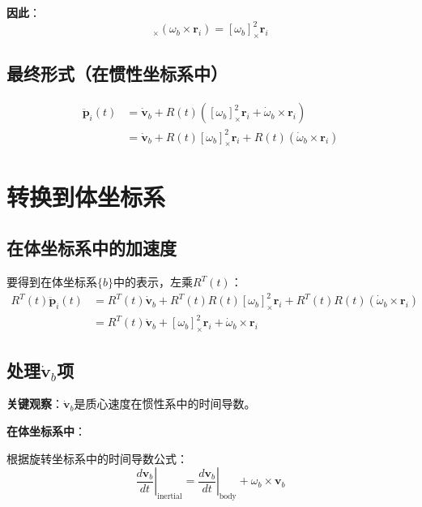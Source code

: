 \documentclass[12pt,a4paper]{article}
\begin{document}
\textbf{因此}：
\begin{equation}
[\omega_b]_{\times} (\omega_b \times \bm{r}_i) = [\omega_b]_{\times}^2 \bm{r}_i
\end{equation}

\subsection{最终形式（在惯性坐标系中）}

\begin{align}
\ddot{\bm{p}}_i(t) &= \dot{\bm{v}}_b + R(t) ([\omega_b]_{\times}^2 \bm{r}_i + \dot{\omega}_b \times \bm{r}_i) \\
&= \dot{\bm{v}}_b + R(t) [\omega_b]_{\times}^2 \bm{r}_i + R(t) (\dot{\omega}_b \times \bm{r}_i)
\label{eq:acceleration_inertial}
\end{align}

\section{转换到体坐标系}

\subsection{在体坐标系中的加速度}

要得到在体坐标系$\{b\}$中的表示，左乘$R^T(t)$：
\begin{align}
R^T(t) \ddot{\bm{p}}_i(t) &= R^T(t) \dot{\bm{v}}_b + R^T(t) R(t) [\omega_b]_{\times}^2 \bm{r}_i + R^T(t) R(t) (\dot{\omega}_b \times \bm{r}_i) \\
&= R^T(t) \dot{\bm{v}}_b + [\omega_b]_{\times}^2 \bm{r}_i + \dot{\omega}_b \times \bm{r}_i
\label{eq:acceleration_body}
\end{align}

\subsection{处理$\dot{\bm{v}}_b$项}

\textbf{关键观察}：$\dot{\bm{v}}_b$是质心速度在惯性系中的时间导数。

\textbf{在体坐标系中}：

根据旋转坐标系中的时间导数公式：
\begin{equation}
\left.\frac{d\bm{v}_b}{dt}\right|_{\text{inertial}} = \left.\frac{d\bm{v}_b}{dt}\right|_{\text{body}} + \omega_b \times \bm{v}_b
\end{equation}
\end{document}
